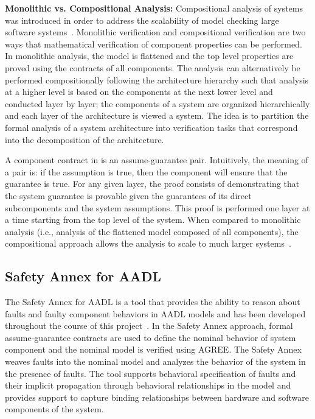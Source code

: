 \textbf{Monolithic vs. Compositional Analysis:} Compositional analysis of systems was introduced in order to address the scalability of model checking large software systems~\cite{pnueli1985transition, heckel1998compositional, NFM2012:CoGaMiWhLaLu}. Monolithic verification and compositional verification are two ways that mathematical verification of component properties can be performed. In monolithic analysis, the model is flattened and the top level properties are proved using the contracts of all components. The analysis can alternatively be performed compositionally following the architecture hierarchy such that analysis at a higher level is based on the components at the next lower level and conducted layer by layer; the components of a system are organized hierarchically and each layer of the architecture is viewed a system. The idea is to partition the formal analysis of a system architecture into verification tasks that correspond into the decomposition of the architecture. 

A component contract in \agree is an assume-guarantee pair. Intuitively, the meaning of a pair is: if the assumption is true, then the component will ensure that the guarantee is true. For any given layer, the proof consists of demonstrating that the system guarantee is provable given the guarantees of its direct subcomponents and the system assumptions. This proof is performed one layer at a time starting from the top level of the system. When compared to monolithic analysis (i.e., analysis of the flattened model composed of all components), the compositional approach allows the analysis to scale to much larger systems~\cite{NFM2012:CoGaMiWhLaLu}. 

\subsection{Safety Annex for AADL}
The Safety Annex for AADL is a tool that provides the ability to reason about faults and faulty component behaviors in AADL models and has been developed throughout the course of this project~\cite{Stewart17:IMBSA,SATechReport, stewart2020safety, nasaFinalReport}. In the Safety Annex approach, formal assume-guarantee contracts are used to define the nominal behavior of system component and the nominal model is verified using AGREE. The Safety Annex weaves faults into the nominal model and analyzes the behavior of the system in the presence of faults. The tool supports behavioral specification of faults and their implicit propagation through behavioral relationships in the model and provides support to capture binding relationships between hardware and software components of the system.
